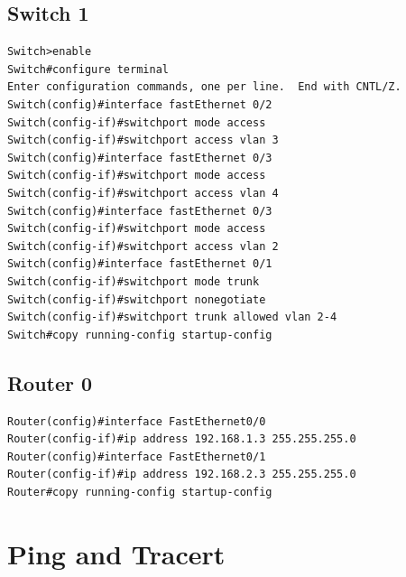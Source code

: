 \documentclass{article}
\begin{document}
\subsection{Switch 1}

\begin{lstlisting}[language=CISCO] 
Switch>enable
Switch#configure terminal 
Enter configuration commands, one per line.  End with CNTL/Z.
Switch(config)#interface fastEthernet 0/2
Switch(config-if)#switchport mode access
Switch(config-if)#switchport access vlan 3
Switch(config)#interface fastEthernet 0/3
Switch(config-if)#switchport mode access
Switch(config-if)#switchport access vlan 4
Switch(config)#interface fastEthernet 0/3
Switch(config-if)#switchport mode access
Switch(config-if)#switchport access vlan 2
Switch(config)#interface fastEthernet 0/1
Switch(config-if)#switchport mode trunk
Switch(config-if)#switchport nonegotiate
Switch(config-if)#switchport trunk allowed vlan 2-4
Switch#copy running-config startup-config

\end{lstlisting} 

\subsection{Router 0}

\begin{lstlisting}[language=CISCO] 
Router(config)#interface FastEthernet0/0
Router(config-if)#ip address 192.168.1.3 255.255.255.0
Router(config)#interface FastEthernet0/1
Router(config-if)#ip address 192.168.2.3 255.255.255.0
Router#copy running-config startup-config 
\end{lstlisting} 


\section{Ping and Tracert}
\end{document}
